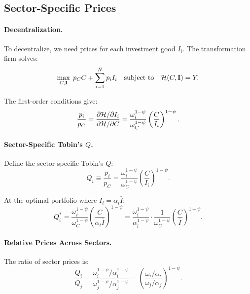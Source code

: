 \subsection{Sector-Specific Prices}
\label{subsec:ac-het-prices}

\paragraph{Decentralization.}
To decentralize, we need prices for each investment good $I_i$. The transformation firm solves:
\begin{equation}
\max_{C, \mathbf{I}} \; p_C C + \sum_{i=1}^{N} p_i I_i \quad \text{subject to} \quad \mathcal{H}(C, \mathbf{I}) = Y.
\label{eq:ac-het-firm}
\end{equation}

The first-order conditions give:
\begin{equation}
\frac{p_i}{p_C} = \frac{\partial \mathcal{H} / \partial I_i}{\partial \mathcal{H} / \partial C} = \frac{\omega_i^{1-\psi}}{\omega_C^{1-\psi}} \left( \frac{C}{I_i} \right)^{1-\psi}.
\label{eq:ac-het-price-ratio}
\end{equation}

\paragraph{Sector-Specific Tobin's $Q$.}
Define the sector-specific Tobin's $Q$:
\begin{equation}
Q_i \equiv \frac{p_i}{p_C} = \frac{\omega_i^{1-\psi}}{\omega_C^{1-\psi}} \left( \frac{C}{I_i} \right)^{1-\psi}.
\label{eq:ac-het-Qi}
\end{equation}

At the optimal portfolio where $I_i = \alpha_i \bar{I}$:
\begin{equation}
Q_i^* = \frac{\omega_i^{1-\psi}}{\omega_C^{1-\psi}} \left( \frac{C}{\alpha_i \bar{I}} \right)^{1-\psi} = \frac{\omega_i^{1-\psi}}{\alpha_i^{1-\psi}} \cdot \frac{1}{\omega_C^{1-\psi}} \left( \frac{C}{\bar{I}} \right)^{1-\psi}.
\label{eq:ac-het-Qi-star}
\end{equation}

\paragraph{Relative Prices Across Sectors.}
The ratio of sector prices is:
\begin{equation}
\frac{Q_i}{Q_j} = \frac{\omega_i^{1-\psi} / \alpha_i^{1-\psi}}{\omega_j^{1-\psi} / \alpha_j^{1-\psi}} = \left( \frac{\omega_i / \alpha_i}{\omega_j / \alpha_j} \right)^{1-\psi}.
\label{eq:ac-het-price-ratio-ij}
\end{equation}

